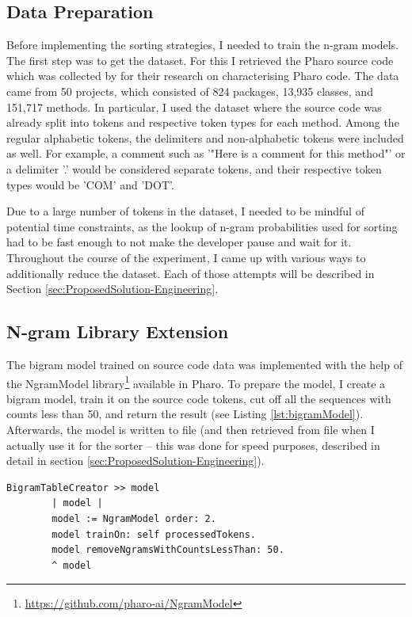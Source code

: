 \subsection{Data Preparation}
Before implementing the sorting strategies, I needed to train the n-gram models. The first step was to get the dataset. For this I retrieved the Pharo source code which was collected by \cite{Zait20a} for their research on characterising Pharo code. The data came from 50 projects, which consisted of 824 packages, 13,935 classes, and 151,717 methods. In particular, I used the dataset where the source code was already split into tokens and respective token types for each method. Among the regular alphabetic tokens, the delimiters and non-alphabetic tokens were included as well. For example, a comment such as '"Here is a comment for this method"' or a delimiter '.' would be considered separate tokens, and their respective token types would be 'COM' and 'DOT'.

Due to a large number of tokens in the dataset, I needed to be mindful of potential time constraints, as the lookup of n-gram probabilities used for sorting had to be fast enough to not make the developer pause and wait for it. Throughout the course of the experiment, I came up with various ways to additionally reduce the dataset. Each of those attempts will be described in Section \ref{sec:ProposedSolution-Engineering}.

\subsection{N-gram Library Extension}
The bigram model trained on source code data was implemented with the help of the NgramModel library\footnote{\url{https://github.com/pharo-ai/NgramModel}} available in Pharo. To prepare the model, I create a bigram model, train it on the source code tokens, cut off all the sequences with counts less than 50, and return the result (see Listing \ref{lst:bigramModel}). Afterwards, the model is written to file (and then retrieved from file when I actually use it for the sorter -- this was done for speed purposes, described in detail in section \ref{sec:ProposedSolution-Engineering}).

\begin{lstlisting}[label={lst:bigramModel}, caption={Here is how the bigram model for sorting is created and trained}]
    BigramTableCreator >> model
        | model |
        model := NgramModel order: 2.
        model trainOn: self processedTokens.
        model removeNgramsWithCountsLessThan: 50.
        ^ model
\end{lstlisting}

